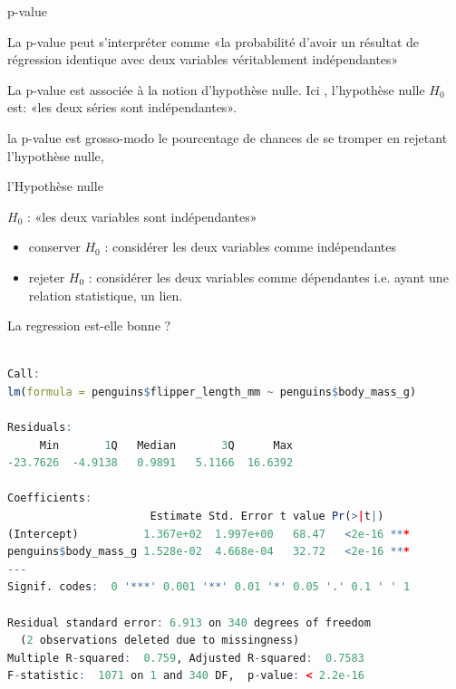 \documentclass{beamer}
\begin{document}
\begin{frame}[fragile]{ p-value}


La p-value peut s'interpréter comme «la probabilité d'avoir un résultat de régression identique avec deux variables véritablement indépendantes» 



La p-value est associée à la notion d'\alert{hypothèse nulle}. 
Ici , l'hypothèse nulle $H_0$ est: «les deux séries sont indépendantes». 

la p-value est grosso-modo le  \alert{pourcentage de chances de se tromper} en rejetant l'hypothèse nulle, 


\end{frame}




\begin{frame}[fragile]{ l'Hypothèse nulle }

$H_0$ : «les deux variables sont indépendantes»

\begin{itemize}
  \item \alert{conserver} $H_0$ : considérer les deux variables comme \alert{indépendantes}
  \item \alert{rejeter} $H_0$ : considérer les deux variables comme \alert{dépendantes} i.e. ayant une relation statistique, un lien.
\end{itemize}


\end{frame}






\begin{frame}[fragile]{La regression est-elle bonne ? }



\begin{tiny}
\begin{spacing}{0.75}
\begin{lstlisting}[language=R,basicstyle=\scriptsize\ttfamily, commentstyle=\ttfamily]

Call:
lm(formula = penguins$flipper_length_mm ~ penguins$body_mass_g)

Residuals:
     Min       1Q   Median       3Q      Max 
-23.7626  -4.9138   0.9891   5.1166  16.6392 

Coefficients:
                      Estimate Std. Error t value Pr(>|t|)    
(Intercept)          1.367e+02  1.997e+00   68.47   <2e-16 ***
penguins$body_mass_g 1.528e-02  4.668e-04   32.72   <2e-16 ***
---
Signif. codes:  0 '***' 0.001 '**' 0.01 '*' 0.05 '.' 0.1 ' ' 1

Residual standard error: 6.913 on 340 degrees of freedom
  (2 observations deleted due to missingness)
Multiple R-squared:  0.759,	Adjusted R-squared:  0.7583 
F-statistic:  1071 on 1 and 340 DF,  p-value: < 2.2e-16
\end{lstlisting}
\end{spacing}
\end{tiny}


\end{frame}
\end{document}
